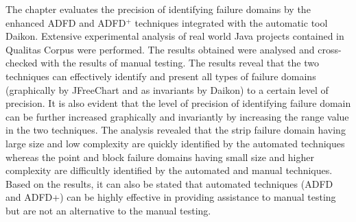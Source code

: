 The chapter evaluates the precision of identifying failure domains by the enhanced ADFD and ADFD$^+$ techniques integrated with the automatic tool Daikon. Extensive experimental analysis of real world Java projects contained in Qualitas Corpus were performed. The results obtained were analysed and cross-checked with the results of manual testing. The results reveal that the two techniques can effectively identify and present all types of failure domains (graphically by JFreeChart and as invariants by Daikon) to a certain level of precision. It is also evident that the level of precision of identifying failure domain can be further increased graphically and invariantly by increasing the range value in the two techniques. 
The analysis revealed that the strip failure domain having large size and low complexity are quickly identified by the automated techniques whereas the point and block failure domains having small size and higher complexity are difficultly identified by the automated and manual techniques. Based on the results, it can also be stated that automated techniques (ADFD and ADFD+) can be highly effective in providing assistance to manual testing but are not an alternative to the manual testing.  

















